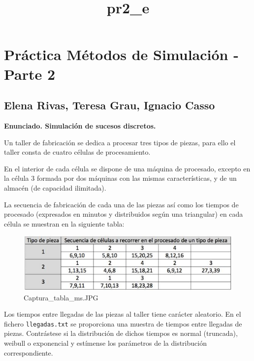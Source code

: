 \documentclass[11pt]{article}
\title{pr2\_e}
\makeatletter
\def\maxwidth{\ifdim\Gin@nat@width>\linewidth\linewidth
    \else\Gin@nat@width\fi}
\let\Oldincludegraphics\includegraphics
\renewcommand{\includegraphics}[1]{\Oldincludegraphics[width=.8\maxwidth]{#1}}
\makeatother
\begin{document}
    
    
    \maketitle
    
    

    
    \section{Práctica Métodos de Simulación - Parte
2}\label{pruxe1ctica-muxe9todos-de-simulaciuxf3n---parte-2}

    \subsection{Elena Rivas, Teresa Grau, Ignacio
Casso}\label{elena-rivas-teresa-grau-ignacio-casso}

    \textbf{Enunciado. Simulación de sucesos discretos.}

Un taller de fabricación se dedica a procesar tres tipos de piezas, para
ello el taller consta de cuatro células de procesamiento.

En el interior de cada célula se dispone de una máquina de procesado,
excepto en la célula 3 formada por dos máquinas con las mismas
características, y de un almacén (de capacidad ilimitada).

La secuencia de fabricación de cada una de las piezas así como los
tiempos de procesado (expresados en minutos y distribuidos según una
triangular) en cada célula se muestran en la siguiente tabla:

\begin{figure}
\centering
\includegraphics{./imagenes/Captura_tabla_ms.JPG}
\caption{Captura\_tabla\_ms.JPG}
\end{figure}

Los tiempos entre llegadas de las piezas al taller tiene carácter
aleatorio. En el fichero \texttt{llegadas.txt} se proporciona una
muestra de tiempos entre llegadas de piezas. Contrástese si la
distribución de dichos tiempos es normal (truncada), weibull o
exponencial y estímense los parámetros de la distribución
correspondiente.
\end{document}
